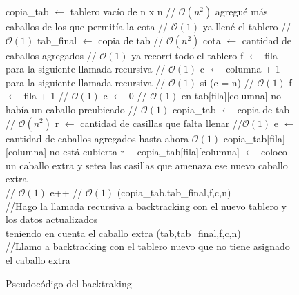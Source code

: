 \begin{figure}
\begin{codebox}
\li copia_tab $\leftarrow$ tablero vacío de n x n // $\mathcal{O}(n^2)$
\li \If agregué más caballos de los que permitía la cota   // $\mathcal{O}(1)$
\li \quad \Return   
\li \If ya llené el tablero                                // $\mathcal{O}(1)$
\li \quad tab_final $\leftarrow$ copia de tab              // $\mathcal{O}(n^2)$
\li \quad cota $\leftarrow$ cantidad de caballos agregados        // $\mathcal{O}(1)$
\li \quad \Return
\li \If ya recorrí todo el tablero
\li \quad \Return
\li f $\leftarrow$ fila para la siguiente llamada recursiva  // $\mathcal{O}(1)$
\li c $\leftarrow$ columna + 1 para la siguiente llamada recursiva  // $\mathcal{O}(1)$
\li si (c = n)                          // $\mathcal{O}(1)$
\li \quad f $\leftarrow$ fila + 1      // $\mathcal{O}(1)$
\li \quad c $\leftarrow$ 0             // $\mathcal{O}(1)$
\li \If en tab[fila][columna] no había un caballo preubicado      // $\mathcal{O}(1)$
\li \quad copia_tab $\leftarrow$ copia de tab              // $\mathcal{O}(n^2)$
\li \quad r $\leftarrow$ cantidad de casillas que falta llenar  //$\mathcal{O}(1)$
\li \quad e $\leftarrow$ cantidad de caballos agregados hasta ahora $\mathcal{O}(1)$
\li \quad \If copia_tab[fila][columna] no está cubierta
\li \quad \quad r- -
\li \quad copia_tab[fila][columna] $\leftarrow$ coloco un caballo extra y setea las casillas que amenaza ese nuevo caballo extra    \\   // $\mathcal{O}(1)$
\li \quad e++          // $\mathcal{O}(1)$
\li {}(copia_tab,tab_final,f,c,n) \\
//Hago la llamada recursiva a backtracking con el nuevo tablero y los datos actualizados \\
teniendo en cuenta el caballo extra
(tab,tab_final,f,c,n)\\
//Llamo a backtracking con el tablero nuevo que no tiene asignado el caballo extra
\end{codebox}
\caption{Pseudocódigo del backtraking}\label{code:backtraking}
\end{figure}
\FloatBarrier

